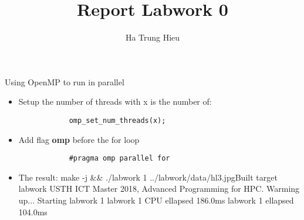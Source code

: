 \documentclass{article}
\title{Report Labwork 0}
\author{Ha Trung Hieu}
\begin{document}
\maketitle

Using OpenMP to run in parallel

\begin{itemize}
	\item Setup the number of threads with x is the number of:
		\begin{verbatim}
			omp_set_num_threads(x);
		\end{verbatim}
	\item Add flag \textbf{omp} before the for loop
		\begin{verbatim}
			#pragma omp parallel for
		\end{verbatim}
	\item The result:\newline
	make -j \&\& ./labwork 1 ../labwork/data/hl3.jpg\newline
	[100\%] Built target labwork\newline
	USTH ICT Master 2018, Advanced Programming for HPC.\newline
	Warming up...\newline
	Starting labwork 1\newline
	labwork 1 CPU ellapsed 186.0ms\newline
	labwork 1 ellapsed 104.0ms
\end{itemize}
\end{document}
